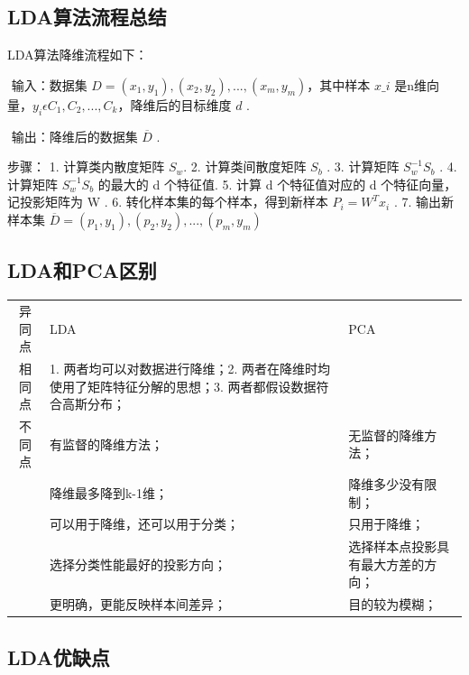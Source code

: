 \subsection{LDA算法流程总结}\label{ldaux7b97ux6cd5ux6d41ux7a0bux603bux7ed3}

LDA算法降维流程如下：

​ 输入：数据集
$D = { (x_1,y_1),(x_2,y_2), ... ,(x_m,y_m) }$，其中样本 $x\_i $
是n维向量，$y_i \epsilon {C_1, C_2, ..., C_k}$，降维后的目标维度
$d$ .

​ 输出：降维后的数据集 $\overline{D} $ .

步骤： 1. 计算类内散度矩阵 $S_w$. 2. 计算类间散度矩阵 $S_b​$ . 3.
计算矩阵 $S^{-1}_wS_b​$ . 4. 计算矩阵 $S^{-1}_wS_b$ 的最大的 d
个特征值. 5. 计算 d 个特征值对应的 d 个特征向量，记投影矩阵为 W . 6.
转化样本集的每个样本，得到新样本 $P_i = W^Tx_i​$ . 7. 输出新样本集
$\overline{D} = { (p_1,y_1),(p_2,y_2),...,(p_m,y_m) }​$

\subsection{LDA和PCA区别}\label{ldaux548cpcaux533aux522b}

\begin{longtable}[]{ cll }
异同点 & LDA & PCA\tabularnewline
相同点 & 1. 两者均可以对数据进行降维；2.
两者在降维时均使用了矩阵特征分解的思想；3. 两者都假设数据符合高斯分布；
&\tabularnewline
不同点 & 有监督的降维方法； & 无监督的降维方法；\tabularnewline
& 降维最多降到k-1维； & 降维多少没有限制；\tabularnewline
& 可以用于降维，还可以用于分类； & 只用于降维；\tabularnewline
& 选择分类性能最好的投影方向； &
选择样本点投影具有最大方差的方向；\tabularnewline
& 更明确，更能反映样本间差异； & 目的较为模糊；\tabularnewline
\end{longtable}

\subsection{ LDA优缺点}\label{ldaux4f18ux7f3aux70b9}

